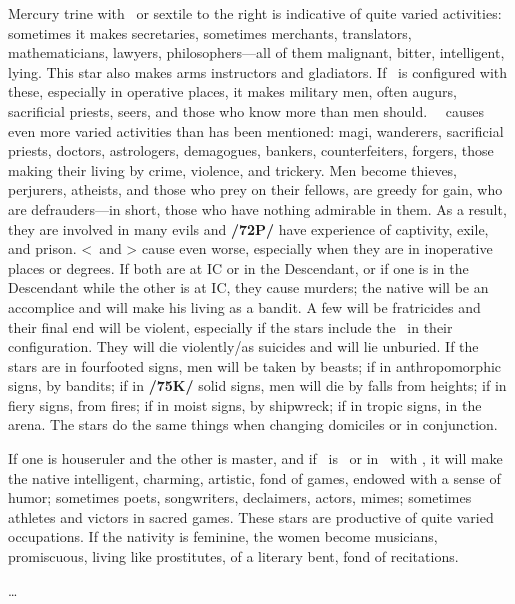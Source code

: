 Mercury \marginnote{\Mercury \Trine \Mars} trine with \Mars\, or sextile to the right is indicative of quite varied activities: sometimes it makes secretaries, sometimes merchants, translators, mathematicians, lawyers, philosophers—all of them malignant, bitter, intelligent, lying. This star also makes arms instructors and gladiators. If \Jupiter\, is configured with these, especially in operative places, it makes military men, often augurs, sacrificial priests,
seers, and those who know more than men should. \Mercury\, \Square\, causes even more varied activities than has been mentioned: magi, wanderers, sacrificial priests, doctors, astrologers, demagogues, bankers, counterfeiters, forgers, those making their living by crime, violence, and trickery. Men become thieves, perjurers, atheists, and those who prey on their fellows, are greedy for gain, who are defrauders—in short, those who have nothing admirable in them. As a result, they are involved in many evils and \textbf{/72P/} have experience of captivity, exile, and prison. <\Mars\, and \Mercury> cause even worse, especially when they are in inoperative places or degrees. If both are at IC or in the Descendant, or if one is in the Descendant while the other is at  IC, they cause murders; the native will be an accomplice and will make his living as a
bandit. A few will be fratricides and their final end will be violent, especially if the stars include the \Moon\, in their configuration. They will die violently/as suicides and will lie unburied. If the stars are in fourfooted signs, men will be taken by beasts; if in anthropomorphic signs, by bandits; if in \textbf{/75K/} solid signs, men will die by falls from heights; if in fiery signs, from fires; if in moist signs, by shipwreck; if in tropic
signs, in the arena. \mndl The stars do the same things when changing domiciles or in conjunction. 

If one is houseruler and the other is master, and if \Mercury\, is \Sextile\, or in \Conjunction\, with \Venus, it will make the native intelligent, charming, artistic, fond of games, endowed with a sense of humor; sometimes poets, songwriters, declaimers, actors, mimes; sometimes athletes and victors in sacred games. These stars are productive of quite varied occupations. If the nativity is feminine, the women become musicians, promiscuous, living like prostitutes, of a literary bent, fond of recitations.

\ldots

